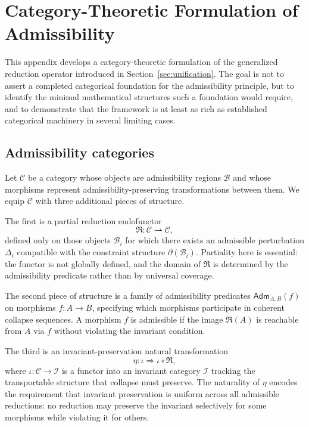\documentclass[12pt, a4paper]{article}
\theoremstyle{plain}
\theoremstyle{definition}
\theoremstyle{remark}
\newcommand{\Bcal}{\mathcal{B}}
\begin{document}
\appendix

\section{Category-Theoretic Formulation of Admissibility}
\label{app:category}

This appendix develops a category-theoretic formulation of the generalized reduction
operator introduced in Section~\ref{sec:unification}. The goal is not to assert a
completed categorical foundation for the admissibility principle, but to identify
the minimal mathematical structures such a foundation would require, and to demonstrate
that the framework is at least as rich as established categorical machinery in several
limiting cases.

\subsection{Admissibility categories}

Let $\mathcal{C}$ be a category whose objects are admissibility regions $\Bcal$ and
whose morphisms represent admissibility-preserving transformations between them.
We equip $\mathcal{C}$ with three additional pieces of structure.

The first is a partial reduction endofunctor
\[
  \mathfrak{R} : \mathcal{C} \rightharpoonup \mathcal{C},
\]
defined only on those objects $\Bcal_i$ for which there exists an admissible
perturbation $\Delta_i$ compatible with the constraint structure $\partial(\Bcal_i)$.
Partiality here is essential: the functor is not globally defined, and the domain
of $\mathfrak{R}$ is determined by the admissibility predicate rather than by
universal coverage.

The second piece of structure is a family of admissibility predicates
$\mathsf{Adm}_{A,B}(f)$ on morphisms $f : A \to B$, specifying which morphisms
participate in coherent collapse sequences.
A morphism $f$ is admissible if the image $\mathfrak{R}(A)$ is reachable from $A$
via $f$ without violating the invariant condition.

The third is an invariant-preservation natural transformation
\[
  \eta : \iota \Rightarrow \iota \circ \mathfrak{R},
\]
where $\iota : \mathcal{C} \to \mathcal{I}$ is a functor into an invariant category
$\mathcal{I}$ tracking the transportable structure that collapse must preserve.
The naturality of $\eta$ encodes the requirement that invariant preservation is
uniform across all admissible reductions: no reduction may preserve the invariant
selectively for some morphisms while violating it for others.
\end{document}
